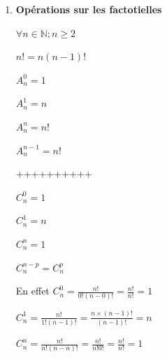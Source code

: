 \documentclass[12pt,a4paper]{article}
\begin{document}
\begin{enumerate}[label=\Roman*., font=\bfseries\color{red}]
\begin{enumerate}
\begin{enumerate}
\begin{itemize}
\begin{itemize}
    \item \textbf{Exemple 2 (Élèves) :} Dans une classe de 4 élèves $\{A, B, C, D\}$, le nombre de façons de choisir un binôme (groupe de 2) pour un exposé est :
    \[ \{A,B\}, \{A,C\}, \{A,D\}, \{B,C\}, \{B,D\}, \{C,D\} \]
    Il y en a $\binom{4}{2} = 6$.

    \item \textbf{Exemple 3 (Loto) :} Au jeu du Loto, le nombre de façons de choisir 6 numéros parmi 49 est une combinaison de 6 parmi 49.
    \( \binom{49}{6} = 13\,983\,816 \)

    \item \textbf{Exemple 4 (Main de cartes) :} Le nombre de mains de 5 cartes que l'on peut recevoir d'un jeu de 32 cartes est :
    \( \binom{32}{5} = 201\,376 \)
\end{itemize}

\end{itemize}
\end{enumerate}

\item \textbf{Opérations sur les factotielles}

$\forall n \in \mathbb{N} ; n \ge 2 $

$n! = n(n - 1)!$

{\color{red}\fboxsep=10pt
}


$A_n^0 = 1$

$A_n^1 = n$

$A_n^n = n!$

$A_n^{n-1} = n!$

++++++++++

$C_n^0 = 1$

$C_n^1 = n$

$C_n^n = 1$

$C_n^{n-p} = C_n^p$

\begin{center}
    {\color{red}
    \fboxsep=10pt
    }
\end{center}

En effet
$C_n^0 = \frac{n!}{0!(n-0)!} = \frac{n!}{n!} = 1$

\vspace{0.4cm}

$C_n^1 = \frac{n!}{1!(n-1)!} = \frac{n \times (n-1)!}{(n-1)!} = n$

\vspace{0.4cm}

$C_n^n = \frac{n!}{n!(n-n)!} = \frac{n!}{n! 0!} = \frac{n!}{n!} = 1$


\end{enumerate}
\end{enumerate}
\end{document}
